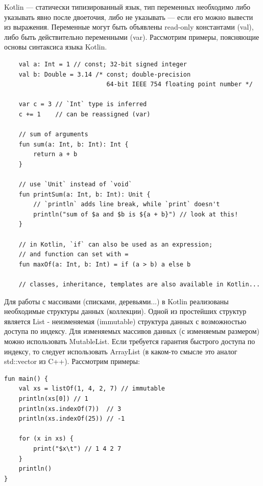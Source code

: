 \documentclass{book}
\begin{document}
Kotlin --- статически типизированный язык, тип переменных необходимо либо указывать явно после
двоеточия, либо не указывать --- если его можно вывести из выражения. Переменные могут быть
объявлены read-only константами (val), либо быть действительно переменными (var). Рассмотрим
примеры, поясняющие основы синтаксиса языка Kotlin.
\begin{verbatim}
    val a: Int = 1 // const; 32-bit signed integer
    val b: Double = 3.14 /* const; double-precision
                            64-bit IEEE 754 floating point number */

    var c = 3 // `Int` type is inferred
    c += 1    // can be reassigned (var)

    // sum of arguments
    fun sum(a: Int, b: Int): Int {
        return a + b
    }

    // use `Unit` instead of `void`
    fun printSum(a: Int, b: Int): Unit {
        // `println` adds line break, while `print` doesn't
        println("sum of $a and $b is ${a + b}") // look at this!
    }

    // in Kotlin, `if` can also be used as an expression;
    // and function can set with =
    fun maxOf(a: Int, b: Int) = if (a > b) a else b

    // classes, inheritance, templates are also available in Kotlin...
\end{verbatim}

Для работы с массивами (списками, деревьями...) в Kotlin реализованы необходимые структуры данных
(коллекции). Одной из простейших структур является List - неизменяемая (immutable) структура данных
с возможностью доступа по индексу. Для изменяемых массивов данных (с изменяемым размером) можно
использовать MutableList. Если требуется гарантия быстрого доступа по индексу, то следует
использовать ArrayList (в каком-то смысле это аналог std::vector из C++). Рассмотрим примеры:
\begin{verbatim}
fun main() {
    val xs = listOf(1, 4, 2, 7) // immutable
    println(xs[0]) // 1
    println(xs.indexOf(7))  // 3
    println(xs.indexOf(25)) // -1

    for (x in xs) {
        print("$x\t") // 1 4 2 7
    }
    println()
}
\end{verbatim}
\end{document}
